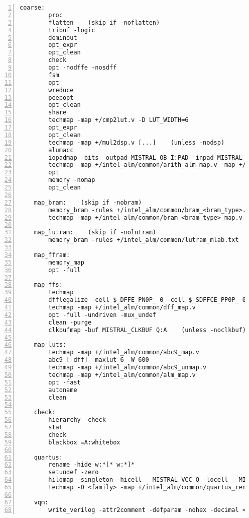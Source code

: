 \begin{lstlisting}[numbers=left,frame=single]
    coarse:
        proc
        flatten    (skip if -noflatten)
        tribuf -logic
        deminout
        opt_expr
        opt_clean
        check
        opt -nodffe -nosdff
        fsm
        opt
        wreduce
        peepopt
        opt_clean
        share
        techmap -map +/cmp2lut.v -D LUT_WIDTH=6
        opt_expr
        opt_clean
        techmap -map +/mul2dsp.v [...]    (unless -nodsp)
        alumacc
        iopadmap -bits -outpad MISTRAL_OB I:PAD -inpad MISTRAL_IB O:PAD -toutpad MISTRAL_IO OE:O:PAD -tinoutpad MISTRAL_IO OE:O:I:PAD A:top    (unless -noiopad)
        techmap -map +/intel_alm/common/arith_alm_map.v -map +/intel_alm/common/dsp_map.v
        opt
        memory -nomap
        opt_clean

    map_bram:    (skip if -nobram)
        memory_bram -rules +/intel_alm/common/bram_<bram_type>.txt
        techmap -map +/intel_alm/common/bram_<bram_type>_map.v

    map_lutram:    (skip if -nolutram)
        memory_bram -rules +/intel_alm/common/lutram_mlab.txt    (for Cyclone V / Cyclone 10GX)

    map_ffram:
        memory_map
        opt -full

    map_ffs:
        techmap
        dfflegalize -cell $_DFFE_PN0P_ 0 -cell $_SDFFCE_PP0P_ 0
        techmap -map +/intel_alm/common/dff_map.v
        opt -full -undriven -mux_undef
        clean -purge
        clkbufmap -buf MISTRAL_CLKBUF Q:A    (unless -noclkbuf)

    map_luts:
        techmap -map +/intel_alm/common/abc9_map.v
        abc9 [-dff] -maxlut 6 -W 600
        techmap -map +/intel_alm/common/abc9_unmap.v
        techmap -map +/intel_alm/common/alm_map.v
        opt -fast
        autoname
        clean

    check:
        hierarchy -check
        stat
        check
        blackbox =A:whitebox

    quartus:
        rename -hide w:*[* w:*]*
        setundef -zero
        hilomap -singleton -hicell __MISTRAL_VCC Q -locell __MISTRAL_GND Q
        techmap -D <family> -map +/intel_alm/common/quartus_rename.v

    vqm:
        write_verilog -attr2comment -defparam -nohex -decimal <file-name>
\end{lstlisting}

